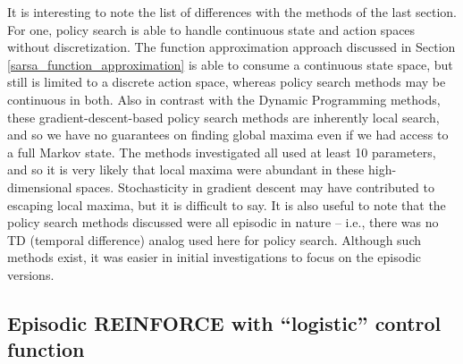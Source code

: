 \documentclass{article}
\begin{document}
It is interesting to note the list of differences with the methods of the last section.  For one, policy search is able to handle continuous state and action spaces without discretization.  The function approximation approach discussed in Section \ref{sarsa_function_approximation} is able to consume a continuous state space, but still is limited to a discrete action space, whereas policy search methods may be continuous in both.  Also in contrast with the Dynamic Programming methods, these gradient-descent-based policy search methods are inherently local search, and so we have no guarantees on finding global maxima even if we had access to a full Markov state.  The methods investigated all used at least 10 parameters, and so it is very likely that local maxima were abundant in these high-dimensional spaces.  Stochasticity in gradient descent may have contributed to escaping local maxima, but it is difficult to say.  It is also useful to note that the policy search methods discussed were all episodic in nature -- i.e., there was no TD (temporal difference) analog used here for policy search.  Although such methods exist, it was easier in initial investigations to focus on the episodic versions.

\subsection{Episodic REINFORCE with ``logistic'' control function}
\end{document}
